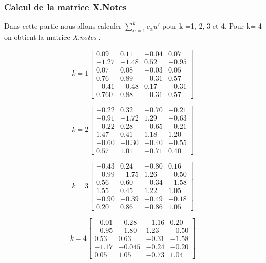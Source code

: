 \documentclass[10pt]{article}
\begin{document}
	\subsubsection{ Calcul de la matrice X.Notes}
	Dans cette partie nous allons calculer $\sum_{\alpha = 1}^{k} c_{\alpha}u'$ pour k =1, 2, 3 et 4.   Pour k= 4 on obtient la matrice \textit{X.notes }. \\
	\begin{minipage}[t]{0.5\textwidth}
	\[
	k=1
	\begin{bmatrix}
	0.09 &	0.11 &	-0.04	& 0.07\\
	-1.27	& -1.48 &	0.52	& -0.95\\
	0.07	& 0.08 &	-0.03	& 0.05\\
	0.76&	0.89 &	-0.31	& 0.57\\
	-0.41	& -0.48 &	0.17	& -0.31\\
	0.760	& 0.88	& -0.31 &	0.57
	\end{bmatrix}
	\]
	\end{minipage}
	\begin{minipage}[t]{0.5\textwidth}
	\[
		k=2
		\begin{bmatrix}
		-0.22 &	0.32 &	-0.70 &	-0.21\\
	-0.91 &	-1.72 &	1.29 &	-0.63\\
	-0.22 &	0.28 &	-0.65 &	-0.21\\
	1.47 &	0.41 &	1.18 &	1.20 \\
	-0.60 &	-0.30 &	-0.40 &	-0.55\\
	0.57&	1.01 &	-0.71	& 0.40	
		\end{bmatrix}
	\]
	\end{minipage}



\begin{minipage}[t]{0.5\textwidth}
	\[
	k=3
	\begin{bmatrix}
	-0.43 &	0.24 &	-0.80 &	0.16\\
	-0.99 &	-1.75 &	1.26 &	-0.50\\
	0.56 &	0.60 &	-0.34 &	-1.58\\
	1.55&	0.45 &	1.22 &	1.05\\
	-0.90 &	-0.39 &	-0.49 &	-0.18\\
	0.20 &	0.86  &	-0.86 &	1.05
	
	\end{bmatrix}
	\]
\end{minipage}
\begin{minipage}[t]{0.5\textwidth}
	\[
	k=4
	\begin{bmatrix}
	-0.01	& -0.28& 	-1.16	&  0.20\\
	-0.95	&  -1.80 & 	1.23 & 	-0.50\\
	0.53 & 	0.63 & 	-0.31	&  -1.58\\
	-1.17	& -0.045 &	-0.24	& -0.20\\
	0.05 &	1.05 &	-0.73 &	1.04
	
	\end{bmatrix}
	\]
\end{minipage}
\end{document}
